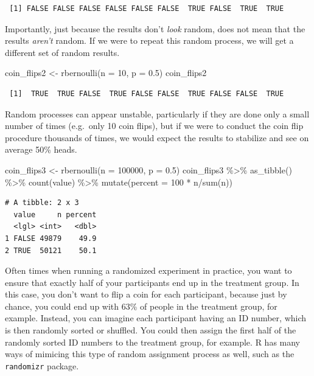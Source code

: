 \documentclass[
  letterpaper,
  DIV=11,
  numbers=noendperiod]{scrreprt}
\newenvironment{Shaded}{\begin{snugshade}}{\end{snugshade}}
\newcommand{\AttributeTok}[1]{\textcolor[rgb]{0.40,0.45,0.13}{#1}}
\newcommand{\DecValTok}[1]{\textcolor[rgb]{0.68,0.00,0.00}{#1}}
\newcommand{\FloatTok}[1]{\textcolor[rgb]{0.68,0.00,0.00}{#1}}
\newcommand{\FunctionTok}[1]{\textcolor[rgb]{0.28,0.35,0.67}{#1}}
\newcommand{\NormalTok}[1]{\textcolor[rgb]{0.00,0.23,0.31}{#1}}
\newcommand{\OtherTok}[1]{\textcolor[rgb]{0.00,0.23,0.31}{#1}}
\newcommand{\SpecialCharTok}[1]{\textcolor[rgb]{0.37,0.37,0.37}{#1}}
\theoremstyle{definition}
\theoremstyle{remark}
\begin{document}
\begin{verbatim}
 [1] FALSE FALSE FALSE FALSE FALSE FALSE  TRUE FALSE  TRUE  TRUE
\end{verbatim}

Importantly, just because the results don't \emph{look} random, does not
mean that the results \emph{aren't} random. If we were to repeat this
random process, we will get a different set of random results.

\begin{Shaded}
\begin{Highlighting}[]
\NormalTok{coin\_flips2 }\OtherTok{\textless{}{-}} \FunctionTok{rbernoulli}\NormalTok{(}\AttributeTok{n =} \DecValTok{10}\NormalTok{, }\AttributeTok{p =} \FloatTok{0.5}\NormalTok{)}
\NormalTok{coin\_flips2}
\end{Highlighting}
\end{Shaded}

\begin{verbatim}
 [1]  TRUE  TRUE FALSE  TRUE FALSE FALSE  TRUE FALSE FALSE  TRUE
\end{verbatim}

Random processes can appear unstable, particularly if they are done only
a small number of times (e.g.~only 10 coin flips), but if we were to
conduct the coin flip procedure thousands of times, we would expect the
results to stabilize and see on average 50\% heads.

\begin{Shaded}
\begin{Highlighting}[]
\NormalTok{coin\_flips3 }\OtherTok{\textless{}{-}} \FunctionTok{rbernoulli}\NormalTok{(}\AttributeTok{n =} \DecValTok{100000}\NormalTok{, }\AttributeTok{p =} \FloatTok{0.5}\NormalTok{)}
\NormalTok{coin\_flips3 }\SpecialCharTok{\%\textgreater{}\%} 
  \FunctionTok{as\_tibble}\NormalTok{() }\SpecialCharTok{\%\textgreater{}\%} 
  \FunctionTok{count}\NormalTok{(value) }\SpecialCharTok{\%\textgreater{}\%} 
  \FunctionTok{mutate}\NormalTok{(}\AttributeTok{percent =} \DecValTok{100} \SpecialCharTok{*}\NormalTok{ n}\SpecialCharTok{/}\FunctionTok{sum}\NormalTok{(n))}
\end{Highlighting}
\end{Shaded}

\begin{verbatim}
# A tibble: 2 x 3
  value     n percent
  <lgl> <int>   <dbl>
1 FALSE 49879    49.9
2 TRUE  50121    50.1
\end{verbatim}

Often times when running a randomized experiment in practice, you want
to ensure that exactly half of your participants end up in the treatment
group. In this case, you don't want to flip a coin for each participant,
because just by chance, you could end up with 63\% of people in the
treatment group, for example. Instead, you can imagine each participant
having an ID number, which is then randomly sorted or shuffled. You
could then assign the first half of the randomly sorted ID numbers to
the treatment group, for example. R has many ways of mimicing this type
of random assignment process as well, such as the \texttt{randomizr}
package.
\end{document}
